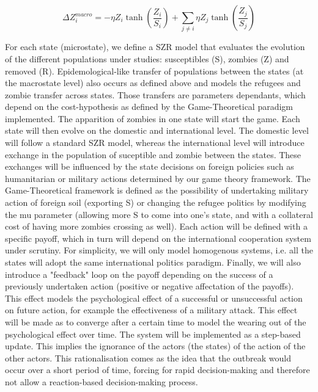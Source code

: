 \documentclass[11pt]{article}
\begin{document}
\begin{equation}
\Delta Z_{i}^{macro} = -\eta Z_{i}\tanh (\frac{Z_{i}}{S_{i}}) + \sum_{j\neq i}{\eta Z_{j}\tanh (\frac{Z_{j}}{S_{j}})}
\end{equation}

For each state (microstate), we define a SZR model that evaluates the evolution of the different populations under studies: susceptibles (S), zombies (Z) and removed (R). Epidemological-like transfer of populations between the states (at the macrostate level) also occurs as defined above and models the refugees and zombie transfer across states. Those transfers are parameters dependants, which depend on the cost-hypothesis as defined by the Game-Theoretical paradigm implemented. The apparition of zombies in one state will start the game. Each state will then evolve on the domestic and international level. The domestic level will follow a standard SZR model, whereas the international level will introduce exchange in the population of suceptible and zombie between the states. These exchanges will be influenced by the state decisions on foreign policies such as humanitarian or military actions determined by our game theory framework. The Game-Theoretical framework is defined as the possibility of undertaking military action of foreign soil (exporting S) or changing the refugee politics by modifying the mu parameter (allowing more S to come into one's state, and with a collateral cost of having more zombies crossing as well). Each action will be defined with a specific payoff, which in turn will depend on the international cooperation system under scrutiny. For simplicity, we will only model homogenous systems, i.e. all the states will adopt the same international politics paradigm. Finally, we will also introduce a "feedback" loop on the payoff depending on the success of a previously undertaken action (positive or negative affectation of the payoffs). This effect models the psychological effect of a successful or unsuccessful action on future action, for example the effectiveness of a military attack. This effect will be made as to converge after a certain time to model the wearing out of the psychological effect over time. The system will be implemented as a step-based update. This implies the ignorance of the actors (the states) of the action of the other actors. This rationalisation comes as the idea that the outbreak would occur over a short period of time, forcing for rapid decision-making and therefore not allow a reaction-based decision-making process. 
\end{document}
